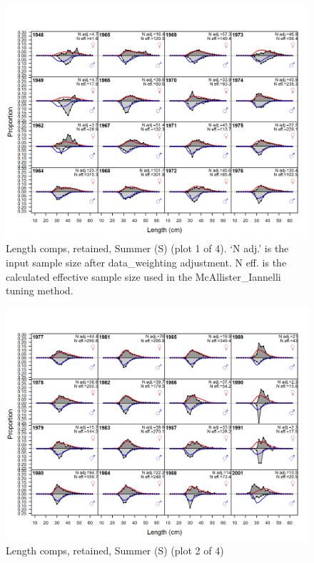 \documentclass[12pt,]{article}
\begin{document}
\begin{figure}
\centering
\includegraphics{r4ss/plots_mod1/comp_lenfit_flt4mkt2_page1.png}
\caption{Length comps, retained, Summer (S) (plot 1 of 4). `N adj.' is
the input sample size after data\_weighting adjustment. N eff. is the
calculated effective sample size used in the McAllister\_Iannelli tuning
method. \label{fig:length_fits}}
\end{figure}

\begin{figure}
\centering
\includegraphics{r4ss/plots_mod1/comp_lenfit_flt4mkt2_page2.png}
\caption{Length comps, retained, Summer (S) (plot 2 of 4)
\label{fig:length_fits}}
\end{figure}
\end{document}
